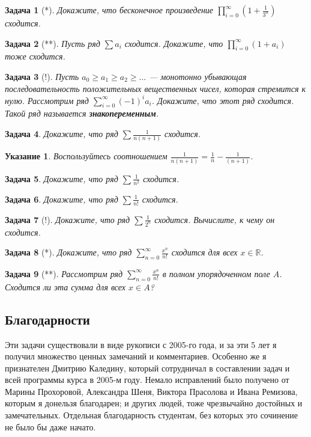 \documentclass[12pt]{book}
\def\R{{\mathbb R}}
\theoremstyle{upshape}
\newtheorem{zadacha}{Задача}[chapter]
\theoremstyle{generic}
\theoremstyle{upshapenonumber}
\newtheorem{ukazanie}{Указание}[section]
\newcommand{\следствие}{%
     \refstepcounter{teorema}
     {\noindent\bf Следствие \thechapter.\arabic{teorema}:\ }}
\newcommand{\пример}{%
     \refstepcounter{teorema}
     {\noindent\bf Пример \thechapter.\arabic{teorema}:\ }}
\newcommand{\лемма}{%
     \refstepcounter{teorema}
     {\noindent\bf Лемма \thechapter.\arabic{teorema}:\ }}
\newcommand{\теорема}{%
     \refstepcounter{teorema}
     {\noindent\bf Теорема \thechapter.\arabic{teorema}:\ }}
\newcommand{\утверждение}{%
     \refstepcounter{teorema}
     {\noindent\bf Утверждение \thechapter.\arabic{teorema}:\ }}
\begin{document}
\begin{zadacha}[*] Докажите, что бесконечное произведение
$\prod^\infty_{i=0} (1+\frac 1 {3^n})$ сходится.
\end{zadacha}

\begin{zadacha}[**] Пусть ряд $\sum a_i$ сходится.
Докажите, что $\prod^\infty_{i=0} (1+a_i)$ тоже сходится.
\end{zadacha}

\begin{zadacha}[!] Пусть $a_0\geq a_1 \geq a_2 \geq \ldots$ ---
монотонно убывающая последовательность положительных вещественных
чисел, которая стремится к нулю. Рассмотрим ряд $\sum^\infty_{i=0}
(-1)^ia_i$. Докажите, что этот ряд сходится. Такой ряд называется
{\bf знакопеременным}.
\end{zadacha}

\begin{zadacha} Докажите, что ряд $\sum \frac 1{n (n+1)}$
сходится.
\end{zadacha}

\begin{ukazanie} Воспользуйтесь соотношением
$\frac 1{n (n+1)}=\frac{1}{n} - \frac 1{(n+1)}$.
\end{ukazanie}

\begin{zadacha} Докажите, что ряд 
$\sum \frac{1}{n^2}$ сходится.
\end{zadacha}

\begin{zadacha} Докажите, что ряд $\sum \frac 1{n!}$
сходится.
\end{zadacha}

\begin{zadacha}[!] Докажите, что ряд $\sum \frac 1{2^n}$
сходится. Вычислите, к чему он сходится.
\end{zadacha}

\begin{zadacha}[*] Докажите, что ряд $\sum_{n=0}^\infty \frac
{x^n}{n!}$ сходится для всех $x\in \R$.
\end{zadacha}

\begin{zadacha}[**] Рассмотрим ряд $\sum_{n=0}^\infty \frac
{x^n}{n!}$ в полном упорядоченном поле $A$. Сходится ли эта сумма
для всех $x\in A$?
\end{zadacha}

\subsection*{Благодарности}

Эти задачи существовали в виде рукописи с 2005-го года,
и за эти 5 лет я получил множество ценных замечаний и
комментариев. Особенно же я признателен Дмитрию Каледину,
который сотрудничал в составлении задач и всей программы
курса в 2005-м году. Немало исправлений было получено
от Марины Прохоровой, Александра Шеня, Виктора Прасолова
и Ивана Ремизова, которым я донельзя благодарен; и других
людей, тоже чрезвычайно достойных и замечательных.
Отдельная благодарность студентам, без которых это
сочинение не было бы даже начато.
\end{document}
